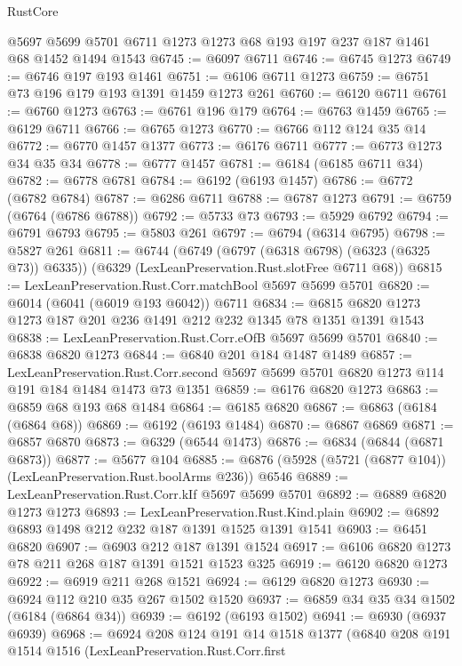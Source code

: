 \begin{lexlean}{RustCore}
\begin{coremodule}
{\begin{coremodule}
{{{{{{{{{{{{{{{{{{{{{{{{{{{{{{{{{{{{{{{{{{{{    @5697
    @5699
    @5701
    @6711
    @1273
    @1273
    @68
    @193
    @197
    @237
    @187
    @1461
    @68
    @1452
    @1494
    @1543
@6745 := @6097 @6711
@6746 := @6745 @1273
@6749 := @6746 @197 @193 @1461
@6751 := @6106 @6711 @1273
@6759 := @6751 @73 @196 @179 @193 @1391 @1459 @1273 @261
@6760 := @6120 @6711
@6761 := @6760 @1273
@6763 := @6761 @196 @179
@6764 := @6763 @1459
@6765 := @6129 @6711
@6766 := @6765 @1273
@6770 := @6766 @112 @124 @35 @14
@6772 := @6770 @1457 @1377
@6773 := @6176 @6711
@6777 := @6773 @1273 @34 @35 @34
@6778 := @6777 @1457
@6781 := @6184 (@6185 @6711 @34)
@6782 := @6778 @6781
@6784 := @6192 (@6193 @1457)
@6786 := @6772 (@6782 @6784)
@6787 := @6286 @6711
@6788 := @6787 @1273
@6791 := @6759 (@6764 (@6786 @6788))
@6792 := @5733 @73
@6793 := @5929 @6792
@6794 := @6791 @6793
@6795 := @5803 @261
@6797 := @6794 (@6314 @6795)
@6798 := @5827 @261
@6811 := @6744
    (@6749 (@6797 (@6318 @6798) (@6323 (@6325 @73)) @6335))
    (@6329 (LexLeanPreservation.Rust.slotFree @6711 @68))
@6815 := LexLeanPreservation.Rust.Corr.matchBool @5697 @5699 @5701
@6820 := @6014 (@6041 (@6019 @193 @6042)) @6711
@6834 := @6815 @6820 @1273 @1273 @187 @201 @236 @1491 @212 @232 @1345 @78 @1351 @1391 @1543
@6838 := LexLeanPreservation.Rust.Corr.eOfB @5697 @5699 @5701
@6840 := @6838 @6820 @1273
@6844 := @6840 @201 @184 @1487 @1489
@6857 := LexLeanPreservation.Rust.Corr.second
    @5697
    @5699
    @5701
    @6820
    @1273
    @114
    @191
    @184
    @1484
    @1473
    @73
    @1351
@6859 := @6176 @6820 @1273
@6863 := @6859 @68 @193 @68 @1484
@6864 := @6185 @6820
@6867 := @6863 (@6184 (@6864 @68))
@6869 := @6192 (@6193 @1484)
@6870 := @6867 @6869
@6871 := @6857 @6870
@6873 := @6329 (@6544 @1473)
@6876 := @6834 (@6844 (@6871 @6873))
@6877 := @5677 @104
@6885 := @6876 (@5928 (@5721 (@6877 @104)) (LexLeanPreservation.Rust.boolArms @236)) @6546
@6889 := LexLeanPreservation.Rust.Corr.kIf @5697 @5699 @5701
@6892 := @6889 @6820 @1273 @1273
@6893 := LexLeanPreservation.Rust.Kind.plain
@6902 := @6892 @6893 @1498 @212 @232 @187 @1391 @1525 @1391 @1541
@6903 := @6451 @6820
@6907 := @6903 @212 @187 @1391 @1524
@6917 := @6106 @6820 @1273 @78 @211 @268 @187 @1391 @1521 @1523 @325
@6919 := @6120 @6820 @1273
@6922 := @6919 @211 @268 @1521
@6924 := @6129 @6820 @1273
@6930 := @6924 @112 @210 @35 @267 @1502 @1520
@6937 := @6859 @34 @35 @34 @1502 (@6184 (@6864 @34))
@6939 := @6192 (@6193 @1502)
@6941 := @6930 (@6937 @6939)
@6968 := @6924
    @208
    @124
    @191
    @14
    @1518
    @1377
    (@6840
      @208
      @191
      @1514
      @1516
      (LexLeanPreservation.Rust.Corr.first
}}}}}}}}}}}}}}}}}}}}}}}}}}}}}}}}}}}}}}}}}}}}
\end{coremodule}}
\end{coremodule}
\end{lexlean}
